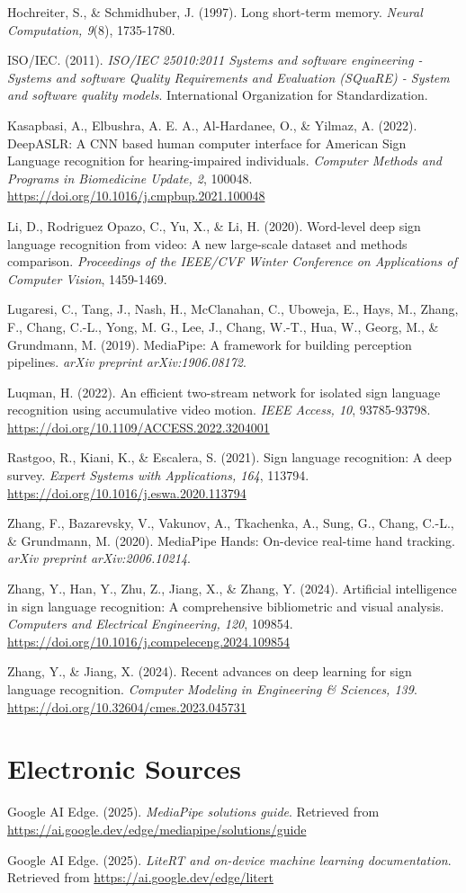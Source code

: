 \noindent Hochreiter, S., \& Schmidhuber, J. (1997). Long short-term memory. \textit{Neural Computation, 9}(8), 1735-1780.

\noindent ISO/IEC. (2011). \textit{ISO/IEC 25010:2011 Systems and software engineering - Systems and software Quality Requirements and Evaluation (SQuaRE) - System and software quality models}. International Organization for Standardization.

\noindent Kasapbasi, A., Elbushra, A. E. A., Al-Hardanee, O., \& Yilmaz, A. (2022). DeepASLR: A CNN based human computer interface for American Sign Language recognition for hearing-impaired individuals. \textit{Computer Methods and Programs in Biomedicine Update, 2}, 100048. \url{https://doi.org/10.1016/j.cmpbup.2021.100048}

\noindent Li, D., Rodriguez Opazo, C., Yu, X., \& Li, H. (2020). Word-level deep sign language recognition from video: A new large-scale dataset and methods comparison. \textit{Proceedings of the IEEE/CVF Winter Conference on Applications of Computer Vision}, 1459-1469.

\noindent Lugaresi, C., Tang, J., Nash, H., McClanahan, C., Uboweja, E., Hays, M., Zhang, F., Chang, C.-L., Yong, M. G., Lee, J., Chang, W.-T., Hua, W., Georg, M., \& Grundmann, M. (2019). MediaPipe: A framework for building perception pipelines. \textit{arXiv preprint arXiv:1906.08172}.

\noindent Luqman, H. (2022). An efficient two-stream network for isolated sign language recognition using accumulative video motion. \textit{IEEE Access, 10}, 93785-93798. \url{https://doi.org/10.1109/ACCESS.2022.3204001}

\noindent Rastgoo, R., Kiani, K., \& Escalera, S. (2021). Sign language recognition: A deep survey. \textit{Expert Systems with Applications, 164}, 113794. \url{https://doi.org/10.1016/j.eswa.2020.113794}

\noindent Zhang, F., Bazarevsky, V., Vakunov, A., Tkachenka, A., Sung, G., Chang, C.-L., \& Grundmann, M. (2020). MediaPipe Hands: On-device real-time hand tracking. \textit{arXiv preprint arXiv:2006.10214}.

\noindent Zhang, Y., Han, Y., Zhu, Z., Jiang, X., \& Zhang, Y. (2024). Artificial intelligence in sign language recognition: A comprehensive bibliometric and visual analysis. \textit{Computers and Electrical Engineering, 120}, 109854. \url{https://doi.org/10.1016/j.compeleceng.2024.109854}

\noindent Zhang, Y., \& Jiang, X. (2024). Recent advances on deep learning for sign language recognition. \textit{Computer Modeling in Engineering \& Sciences, 139}. \url{https://doi.org/10.32604/cmes.2023.045731}

\section*{Electronic Sources}

\noindent Google AI Edge. (2025). \textit{MediaPipe solutions guide}. Retrieved from \url{https://ai.google.dev/edge/mediapipe/solutions/guide}

\noindent Google AI Edge. (2025). \textit{LiteRT and on-device machine learning documentation}. Retrieved from \url{https://ai.google.dev/edge/litert}
